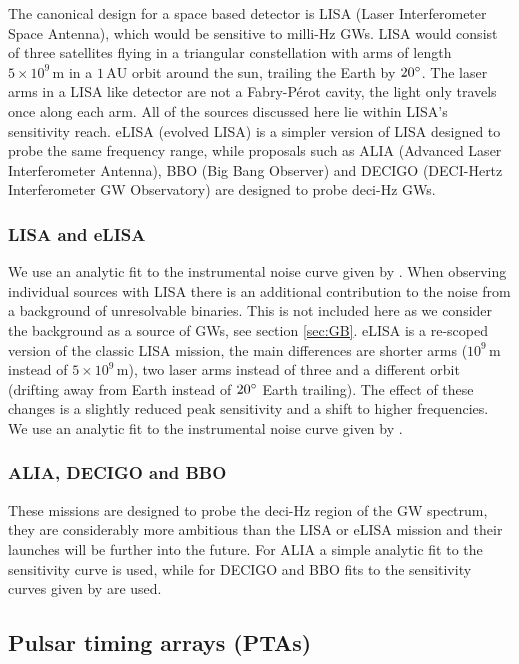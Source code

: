 The canonical design for a space based detector is LISA (Laser Interferometer Space Antenna), which would be sensitive to milli-Hz GWs. LISA would consist of three satellites flying in a triangular constellation with arms of length $5\times 10^{9}\,\textrm{m}$ in a $1\,\textrm{AU}$ orbit around the sun, trailing the Earth by $20^\circ$. The laser arms in a LISA like detector are not a Fabry-P\'{e}rot cavity, the light only travels once along each arm. All of the sources discussed here lie within LISA's sensitivity reach. eLISA (evolved LISA) is a simpler version of LISA designed to probe the same frequency range, while proposals such as ALIA (Advanced Laser Interferometer Antenna), BBO (Big Bang Observer) and DECIGO (DECI-Hertz Interferometer GW Observatory) are designed to probe deci-Hz GWs.

\subsubsection{LISA and eLISA}
We use an analytic fit to the instrumental noise curve given by \cite{Sathyaprakash}. When observing individual sources with LISA there is an additional contribution to the noise from a background of unresolvable binaries. This is not included here as we consider the background as a source of GWs, see section \ref{sec:GB}. eLISA is a re-scoped version of the classic LISA mission, the main differences are shorter arms ($10^{9}\,\textrm{m}$ instead of $5\times 10^{9}\,\textrm{m}$), two laser arms instead of three and a different orbit (drifting away from Earth instead of $20^\circ$ Earth trailing). The effect of these changes is a slightly reduced peak sensitivity and a shift to higher frequencies. We use an analytic fit to the instrumental noise curve given by \cite{Amaro-Seoane-et-al}.

\subsubsection{ALIA, DECIGO and BBO}
These missions are designed to probe the deci-Hz region of the GW spectrum, they are considerably more ambitious than the LISA or eLISA mission and their launches will be further into the future. For ALIA a simple analytic fit to the sensitivity curve is used, while for DECIGO and BBO fits to the sensitivity curves given by \cite{2011PhRvD..83d4011Y} are used.



\subsection{Pulsar timing arrays (PTAs)}\label{sec:PTAgeneralproperties}

